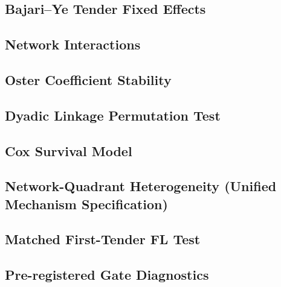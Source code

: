 

\clearpage



\subsection{Bajari--Ye Tender Fixed Effects}



\subsection{Network Interactions}



\subsection{Oster Coefficient Stability}



\subsection{Dyadic Linkage Permutation Test}



\subsection{Cox Survival Model}



\subsection{Network-Quadrant Heterogeneity (Unified Mechanism Specification)}



\subsection{Matched First-Tender FL Test}



\subsection{Pre-registered Gate Diagnostics}

